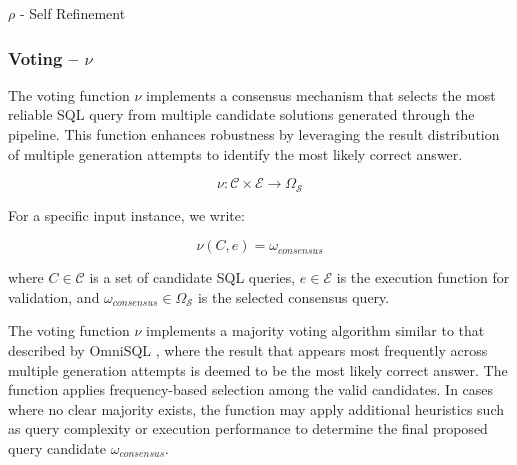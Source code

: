 \begin{algorithm}
\caption{$\rho$ - Self Refinement}\label{algorithms:rho}
\begin{algorithmic}[1]
\end{algorithmic}
\end{algorithm}

\subsubsection{Voting – $\nu$}\label{design:voting-function}

The voting function $\nu$ implements a consensus mechanism that selects the most
reliable SQL query from multiple candidate solutions generated through the pipeline.
This function enhances robustness by leveraging the result distribution of multiple
generation attempts to identify the most likely correct answer.

$$
\nu: \mathcal{C} \times \mathcal{E} \rightarrow \Omega_{\mathcal{S}}
$$

\vspace{0.5em}

For a specific input instance, we write:

$$
\nu(C, e) = \omega_{consensus}
$$

where $C \in \mathcal{C}$ is a set of candidate SQL queries, $e \in \mathcal{E}$ is
the execution function for validation, and $\omega_{consensus} \in \Omega_{\mathcal{S}}$
is the selected consensus query.

\vspace{0.5em}

The voting function $\nu$ implements a majority voting algorithm similar to that
described by OmniSQL \citep{OmniSQL}, where the result that appears most frequently
across multiple generation attempts is deemed to be the most likely correct answer.
The function applies frequency-based selection among the valid candidates. In cases where
no clear majority exists, the function may apply additional heuristics such as query
complexity or execution performance to determine the final proposed query candidate $\omega_{consensus}$.

